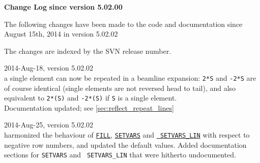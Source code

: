 \begin{center} 
\textbf{\madx Change Log}
\vspace{1cm}
\textbf{since version 5.02.00}
\end{center}

The following changes have been made to the code and documentation since
August 15th, 2014 in version 5.02.02

The changes are indexed by the SVN release number. 

\begin{madlist}

   2014-Aug-18, version 5.02.02 \\
  a single element can now be repeated in a beamline expansion:
  \texttt{2*S} and \texttt{-2*S} are of course identical (single
  elements are not reversed head to tail), and also equivalent to
  \texttt{2*(S)} and \texttt{-2*(S)} if \texttt{S} is a single
  element.\\
  Documentation updated; see \ref{sec:reflect_repeat_lines}


   2014-Aug-25, version 5.02.02 \\
  harmonized the behaviour of \hyperref[sec:fill]{\tt FILL},
  \hyperref[sec:setvars]{\tt SETVARS} and \hyperref[sec:setvars_lin]{\tt
    SETVARS\_LIN} with respect to negative row numbers, and updated the
  default values. Added documentation sections for {\tt SETVARS} and {\tt
    SETVARS\_LIN} that were hitherto undocumented.  

\end{madlist}
  


\newpage

